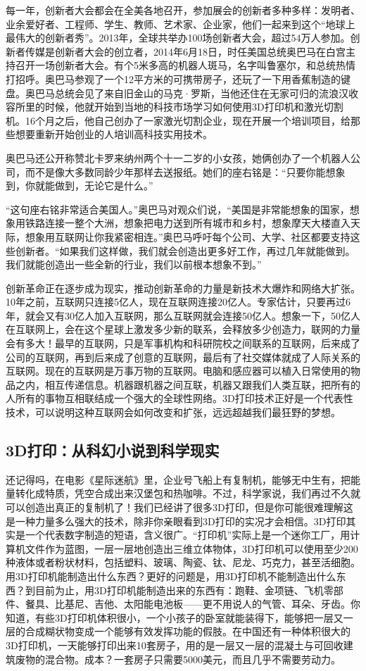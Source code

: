 每一年，创新者大会都会在全美各地召开，参加展会的创新者多种多样：发明者、业余爱好者、工程师、学生、教师、艺术家、企业家，他们一起来到这个“地球上最伟大的创新者秀”。2013年，全球共举办100场创新者大会，超过54万人参加。创新者传媒是创新者大会的创立者，2014年6月18日，时任美国总统奥巴马在白宫主持召开一场创新者大会。有个5米多高的机器人斑马，名字叫鲁塞尔，和总统热情打招呼。奥巴马参观了一个12平方米的可携带房子，还玩了一下用香蕉制造的键盘。奥巴马总统会见了来自旧金山的马克·罗斯，当他还住在无家可归的流浪汉收容所里的时候，他就开始到当地的科技市场学习如何使用3D打印机和激光切割机。16个月之后，他自己创办了一家激光切割企业，现在开展一个培训项目，给那些想要重新开始创业的人培训高科技实用技术。

奥巴马还公开称赞北卡罗来纳州两个十一二岁的小女孩，她俩创办了一个机器人公司，而不是像大多数同龄少年那样去送报纸。她们的座右铭是：“只要你能想象到，你就能做到，无论它是什么。”

“这句座右铭非常适合美国人。”奥巴马对观众们说，“美国是非常能想象的国家，想象用铁路连接一整个大洲，想象把电力送到所有城市和乡村，想象摩天大楼直入天际，想象用互联网让你我紧密相连。”奥巴马呼吁每个公司、大学、社区都要支持这些创新者。“如果我们这样做，我们就会创造出更多好工作，再过几年就能做到。我们就能创造出一些全新的行业，我们以前根本想象不到。”

创新革命正在逐步成为现实，推动创新革命的力量是新技术大爆炸和网络大扩张。10年之前，互联网只连接5亿人，现在互联网连接20亿人。专家估计，只要再过6年，就会又有30亿人加入互联网，那么互联网就会连接50亿人。想象一下，50亿人在互联网上，会在这个星球上激发多少新的联系，会释放多少创造力，联网的力量会有多大！最早的互联网，只是军事机构和科研院校之间联系的互联网，后来成了公司的互联网，再到后来成了创意的互联网，最后有了社交媒体就成了人际关系的互联网。现在的互联网是万事万物的互联网。电脑和感应器可以植入日常使用的物品之内，相互传递信息。机器跟机器之间互联，机器又跟我们人类互联，把所有的人所有的事物互相联结成一个强大的全球性网络。3D打印技术正好是一个代表性技术，可以说明这种互联网会如何改变和扩张，远远超越我们最狂野的梦想。

\subsection{3D打印：从科幻小说到科学现实}

还记得吗，在电影《星际迷航》里，企业号飞船上有复制机，能够无中生有，把能量转化成特质，凭空合成出来汉堡包和热咖啡。不过，科学家说，我们再过不久就可以创造出真正的复制机了！我们已经讲了很多3D打印，但是你可能很难理解这是一种力量多么强大的技术，除非你亲眼看到3D打印的实况才会相信。3D打印其实是一个代表数字制造的短语，含义很广。“打印机”实际上是一个迷你工厂，用计算机文件作为蓝图，一层一层地创造出三维立体物体，3D打印机可以使用至少200种液体或者粉状材料，包括塑料、玻璃、陶瓷、钛、尼龙、巧克力，甚至活细胞。用3D打印机能制造出什么东西？更好的问题是，用3D打印机不能制造出什么东西？到目前为止，用3D打印机能制造出来的东西有：跑鞋、金项链、飞机零部件、餐具、比基尼、吉他、太阳能电池板——更不用说人的气管、耳朵、牙齿。你知道，有些3D打印机体积很小，一个小孩子的卧室就能装得下，能够把一层又一层的合成糊状物变成一个能够有效发挥功能的假肢。在中国还有一种体积很大的3D打印机，一天能够打印出来10套房子，用的是一层又一层的混凝土与可回收建筑废物的混合物。成本？一套房子只需要5000美元，而且几乎不需要劳动力。

